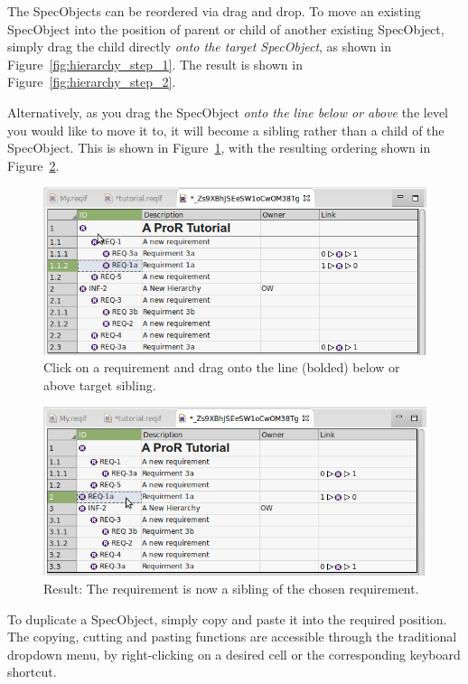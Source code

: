 The SpecObjects can be reordered via drag and drop.  To move an existing SpecObject into the position of parent or child of another existing SpecObject, simply drag the child directly \textit{onto the target SpecObject}, as shown in Figure~\ref{fig:hierarchy_step_1}. The result is shown in Figure~\ref{fig:hierarchy_step_2}. 

Alternatively, as you drag the SpecObject \textit{onto the line below or above} the level you would like to move it to, it will become a sibling rather than a child of the SpecObject.  This is shown in Figure~\ref{fig:hierarchy_step_3}, with the resulting ordering shown in Figure~\ref{fig:hierarchy_step_4}.

\begin{figure}
  \centering
  \includegraphics[width=0.8\linewidth]{../rmf-images/hierarchy_step_3.png}
  \caption{Click on a requirement and drag onto the line (bolded) below or above target sibling.}
  \label{fig:hierarchy_step_3}
\end{figure}
\begin{figure}
  \centering
  \includegraphics[width=0.8\linewidth]{../rmf-images/hierarchy_step_4.png}
  \caption{Result: The requirement is now a sibling of the chosen requirement.}
  \label{fig:hierarchy_step_4}
\end{figure}

To duplicate a SpecObject, simply copy and paste it into the required position. The copying, cutting and pasting functions are accessible through the traditional dropdown menu, by right-clicking on a desired cell or the corresponding keyboard shortcut.

